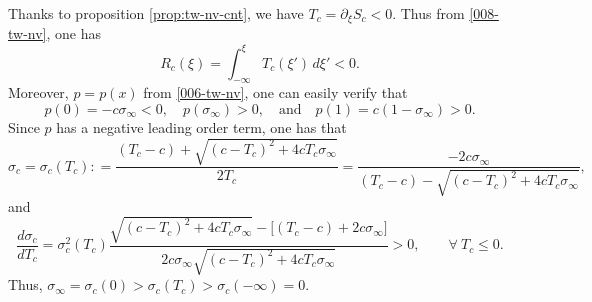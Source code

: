 \documentclass[12pt]{article}
\theoremstyle{definition}
\theoremstyle{remark}
\numberwithin{equation}{section}
\begin{document}
Thanks to proposition \ref{prop:tw-nv-cnt}, we have $ T_c = \partial_\xi S_c < 0 $. Thus from \eqref{008-tw-nv}, one has 
\begin{equation}
    \label{301-tw-nv}
    R_c(\xi) = \int_{-\infty}^\xi T_c(\xi')\,d\xi' < 0.
\end{equation}
Moreover, $ p = p(x) $ from \eqref{006-tw-nv}, one can easily verify that
\begin{equation}
    \label{302-tw-nv}
    p(0) = - c \sigma_\infty < 0, \quad p(\sigma_\infty) > 0, \quad \text{and} \quad  p(1) = c(1-\sigma_\infty)  > 0.
\end{equation}
Since $ p $ has a negative leading order term, one has that 
\begin{equation}
    \label{303-tw-nv}
    \sigma_c = \sigma_c(T_c) : = \frac{(T_c - c) + \sqrt{(c-T_c)^2 + 4 c T_c \sigma_\infty}}{2 T_c} = \frac{-2 c \sigma_\infty}{(T_c-c) - \sqrt{(c-T_c)^2 + 4 c T_c \sigma_\infty}},
\end{equation}
and
\begin{equation}
    \label{304-tw-nv}
    \frac{d\sigma_c}{dT_c} = \sigma_c^2(T_c) \frac{ \sqrt{(c-T_c)^2 + 4c T_c \sigma_\infty} - \lbrack (T_c - c) + 2 c \sigma_\infty \rbrack }{ 2c\sigma_\infty \sqrt{(c-T_c)^2 + 4c T_c \sigma_\infty}} > 0,  \qquad \forall \ T_c \leq 0. 
\end{equation}
Thus, $ \sigma_\infty = \sigma_c(0) > \sigma_c(T_c) > \sigma_c(-\infty) = 0 $. 
\end{document}
